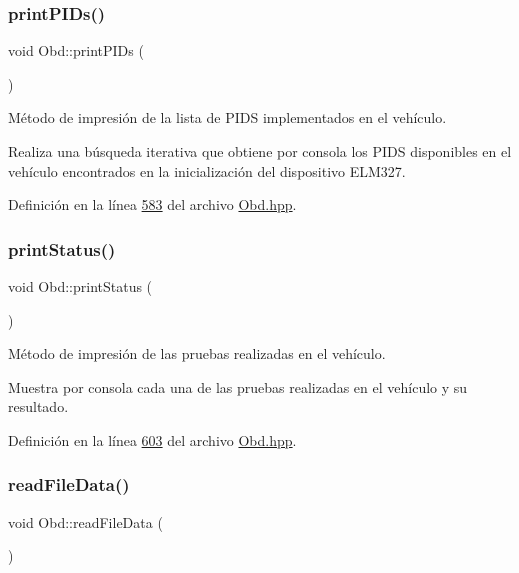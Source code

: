 \subsubsection{\texorpdfstring{print\+P\+I\+Ds()}{printPIDs()}}
{\footnotesize\ttfamily void Obd\+::print\+P\+I\+Ds (\begin{DoxyParamCaption}{ }\end{DoxyParamCaption})\hspace{0.3cm}{\ttfamily [inline]}}



Método de impresión de la lista de P\+I\+DS implementados en el vehículo. 

Realiza una búsqueda iterativa que obtiene por consola los P\+I\+DS disponibles en el vehículo encontrados en la inicialización del dispositivo E\+L\+M327. 

Definición en la línea \hyperlink{Obd_8hpp_source_l00583}{583} del archivo \hyperlink{Obd_8hpp_source}{Obd.\+hpp}.

\mbox{\label{classObd_a0938bfdd6d05795e826a239cc0f29f32}} 
\subsubsection{\texorpdfstring{print\+Status()}{printStatus()}}
{\footnotesize\ttfamily void Obd\+::print\+Status (\begin{DoxyParamCaption}{ }\end{DoxyParamCaption})\hspace{0.3cm}{\ttfamily [inline]}}



Método de impresión de las pruebas realizadas en el vehículo. 

Muestra por consola cada una de las pruebas realizadas en el vehículo y su resultado. 

Definición en la línea \hyperlink{Obd_8hpp_source_l00603}{603} del archivo \hyperlink{Obd_8hpp_source}{Obd.\+hpp}.

\mbox{\label{classObd_a2b8bd75834351a2205d53aec8b3747be}} 
\subsubsection{\texorpdfstring{read\+File\+Data()}{readFileData()}}
{\footnotesize\ttfamily void Obd\+::read\+File\+Data (\begin{DoxyParamCaption}{ }\end{DoxyParamCaption})\hspace{0.3cm}{\ttfamily [inline]}}



